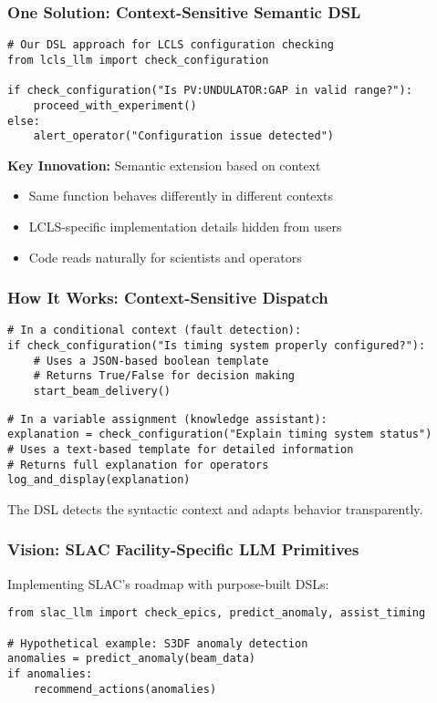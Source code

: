 \documentclass{beamer}
\begin{document}
\begin{frame}[fragile]
\frametitle{One Solution: Context-Sensitive Semantic DSL}

\begin{lstlisting}
# Our DSL approach for LCLS configuration checking
from lcls_llm import check_configuration

if check_configuration("Is PV:UNDULATOR:GAP in valid range?"):
    proceed_with_experiment()
else:
    alert_operator("Configuration issue detected")
\end{lstlisting}

\vspace{0.5cm}
\textbf{Key Innovation:} Semantic extension based on context
\begin{itemize}
\item Same function behaves differently in different contexts
\item LCLS-specific implementation details hidden from users
\item Code reads naturally for scientists and operators
\end{itemize}
\end{frame}

\begin{frame}[fragile]
\frametitle{How It Works: Context-Sensitive Dispatch}

\begin{lstlisting}
# In a conditional context (fault detection):
if check_configuration("Is timing system properly configured?"):
    # Uses a JSON-based boolean template
    # Returns True/False for decision making
    start_beam_delivery()
\end{lstlisting}

\begin{lstlisting}
# In a variable assignment (knowledge assistant):
explanation = check_configuration("Explain timing system status")
# Uses a text-based template for detailed information
# Returns full explanation for operators
log_and_display(explanation)
\end{lstlisting}

\vspace{0.2cm}
The DSL detects the syntactic context and adapts behavior transparently.
\end{frame}

\begin{frame}[fragile]
\frametitle{Vision: SLAC Facility-Specific LLM Primitives}

Implementing SLAC's roadmap with purpose-built DSLs:

\begin{lstlisting}
from slac_llm import check_epics, predict_anomaly, assist_timing

# Hypothetical example: S3DF anomaly detection
anomalies = predict_anomaly(beam_data)
if anomalies:
    recommend_actions(anomalies)

\end{lstlisting}
\end{frame}
\end{document}
